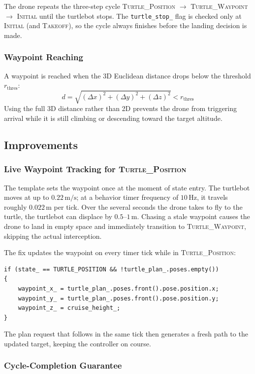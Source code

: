 \documentclass[12pt,twoside,letterpaper]{article}
\begin{document}
The drone repeats the three-step cycle \textsc{Turtle\_Position} $\to$ \textsc{Turtle\_Waypoint} $\to$ \textsc{Initial} until the turtlebot stops. The \texttt{turtle\_stop\_} flag is checked only at \textsc{Initial} (and \textsc{Takeoff}), so the cycle always finishes before the landing decision is made.

\subsubsection{Waypoint Reaching}

A waypoint is reached when the 3D Euclidean distance drops below the threshold $r_{\text{thres}}$:
\[
    d = \sqrt{(\Delta x)^2 + (\Delta y)^2 + (\Delta z)^2} < r_{\text{thres}}
\]
Using the full 3D distance rather than 2D prevents the drone from triggering arrival while it is still climbing or descending toward the target altitude.

\subsection{Improvements}

\subsubsection{Live Waypoint Tracking for \textsc{Turtle\_Position}}

The template sets the waypoint once at the moment of state entry. The turtlebot moves at up to $0.22\,\text{m/s}$; at a behavior timer frequency of $10\,\text{Hz}$, it travels roughly $0.022\,\text{m}$ per tick. Over the several seconds the drone takes to fly to the turtle, the turtlebot can displace by $0.5$--$1\,\text{m}$. Chasing a stale waypoint causes the drone to land in empty space and immediately transition to \textsc{Turtle\_Waypoint}, skipping the actual interception.

The fix updates the waypoint on every timer tick while in \textsc{Turtle\_Position}:
\begin{verbatim}
if (state_ == TURTLE_POSITION && !turtle_plan_.poses.empty())
{
    waypoint_x_ = turtle_plan_.poses.front().pose.position.x;
    waypoint_y_ = turtle_plan_.poses.front().pose.position.y;
    waypoint_z_ = cruise_height_;
}
\end{verbatim}
The plan request that follows in the same tick then generates a fresh path to the updated target, keeping the controller on course.

\subsubsection{Cycle-Completion Guarantee}
\end{document}
